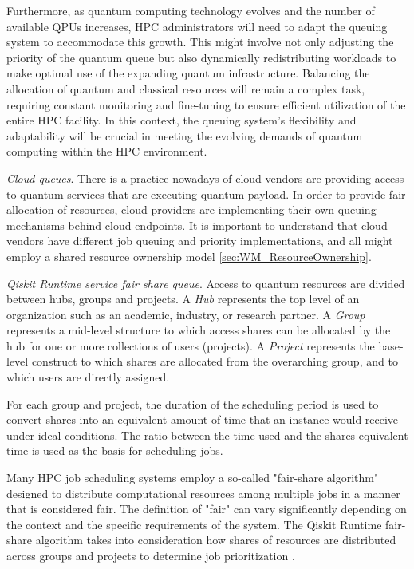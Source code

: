 Furthermore, as quantum computing technology evolves and the number of available QPUs increases, HPC administrators will need to adapt the queuing system to accommodate this growth. This might involve not only adjusting the priority of the quantum queue but also dynamically redistributing workloads to make optimal use of the expanding quantum infrastructure. Balancing the allocation of quantum and classical resources will remain a complex task, requiring constant monitoring and fine-tuning to ensure efficient utilization of the entire HPC facility. In this context, the queuing system's flexibility and adaptability will be crucial in meeting the evolving demands of quantum computing within the HPC environment.

\textit{Cloud queues}. There is a practice nowadays of cloud vendors are providing access to quantum services that are executing quantum payload. In order to provide fair allocation of resources, cloud providers are implementing their own queuing mechanisms behind cloud endpoints. It is important to understand that cloud vendors have different job queuing and priority implementations, and all might employ a shared resource ownership model \ref{sec:WM_ResourceOwnership}. 

\textit{Qiskit Runtime service fair share queue}. Access to quantum resources are divided between hubs, groups and projects.
A \textit{Hub} represents the top level of an organization such as an academic, industry, or research partner.
A \textit{Group} represents a mid-level structure to which access shares can be allocated by the hub for one or more collections of users (projects).
A \textit{Project} represents the base-level construct to which shares are allocated from the overarching group, and to which users are directly assigned.

For each group and project, the duration of the scheduling period is used to convert shares into an equivalent amount of time that an instance would receive under ideal conditions. The ratio between the time used and the shares equivalent time is used as the basis for scheduling jobs.

Many HPC job scheduling systems employ a so-called "fair-share algorithm" designed to distribute computational resources among multiple jobs in a manner that is considered fair. The definition of "fair" can vary significantly depending on the context and the specific requirements of the system. The Qiskit Runtime fair-share algorithm takes into consideration how shares of resources are distributed across groups and projects to determine job prioritization \cite{qiskitRuntimeFairShare}.



